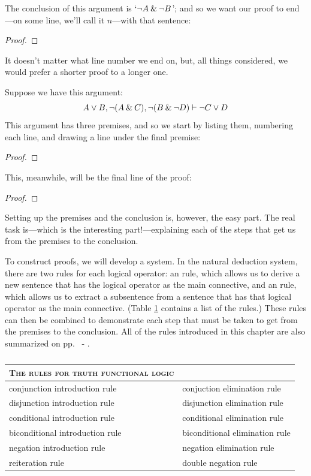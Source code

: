 The conclusion of this argument is `${\neg} A \mathbin{\&} {\neg} B$'; and so we want our proof to end---on some line, we'll call it $n$---with that sentence:
\begin{proof}
	 \pr{}
	\have[ ]{}{\ldots}
	\have[ ]{}{\ldots}
\end{proof}
It doesn't matter what line number we end on, but, all things considered, we would prefer a shorter proof to a longer one.

Suppose we have this argument:
$$A\vee B, {\neg} (A\mathbin{\&} C), {\neg} (B \mathbin{\&} {\neg} D) \vdash {\neg} C\vee D$$
This argument has three premises, and so we start by listing them, numbering each line, and drawing a line under the final premise:
\begin{proof}
	 \pr{}
	 \pr{}
	 \pr{}
\end{proof}
This, meanwhile, will be the final line of the proof:
\begin{proof}
\end{proof}
Setting up the premises and the conclusion is, however, the easy part. The real task is---which is the interesting part!---explaining each of the steps that get us from the premises to the conclusion. 

To construct proofs, we will develop a  system. In the natural deduction system, there are two rules for each logical operator: an  rule, which allows us to derive a new sentence that has the logical operator as the main connective, and an  rule, which allows us to extract a subsentence from a sentence that has that logical operator as the main connective. (Table \ref{table.TFL-rules} contains a list of the rules.) These rules can then be combined to demonstrate each step that must be taken to get from the premises to the conclusion. All of the rules introduced in this chapter are also summarized on pp.~\pageref{ProofRules} - \pageref{ProofRules-end}.


\begin{table}\centering\sffamily\footnotesize
{}
\begin{tabular}{@{}l l@{}}\toprule
\textsc{The rules for truth functional logic} & \\\midrule
conjunction introduction rule & conjuction elimination rule \\
disjunction introduction rule & disjunction elimination rule \\
conditional introduction rule & conditional elimination rule \\
biconditional introduction rule & biconditional elimination rule \\
negation introduction rule & negation elimination rule \\
reiteration rule & double negation rule\\
\bottomrule
\end{tabular}
\caption{}\label{table.TFL-rules}
\end{table}



